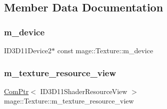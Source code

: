 \subsection{Member Data Documentation}
\hypertarget{classmage_1_1_texture_ad5409f37b321649bc1a12bcee8eb661b}{}\label{classmage_1_1_texture_ad5409f37b321649bc1a12bcee8eb661b} 
\subsubsection{\texorpdfstring{m\+\_\+device}{m\_device}}
{\footnotesize\ttfamily I\+D3\+D11\+Device2$\ast$ const mage\+::\+Texture\+::m\+\_\+device\hspace{0.3cm}{\ttfamily [private]}}

\hypertarget{classmage_1_1_texture_a3de1d2d744e7bb276b0f66d72640e423}{}\label{classmage_1_1_texture_a3de1d2d744e7bb276b0f66d72640e423} 
\subsubsection{\texorpdfstring{m\+\_\+texture\+\_\+resource\+\_\+view}{m\_texture\_resource\_view}}
{\footnotesize\ttfamily \hyperlink{namespacemage_ae74f374780900893caa5555d1031fd79}{Com\+Ptr}$<$ I\+D3\+D11\+Shader\+Resource\+View $>$ mage\+::\+Texture\+::m\+\_\+texture\+\_\+resource\+\_\+view\hspace{0.3cm}{\ttfamily [private]}}

